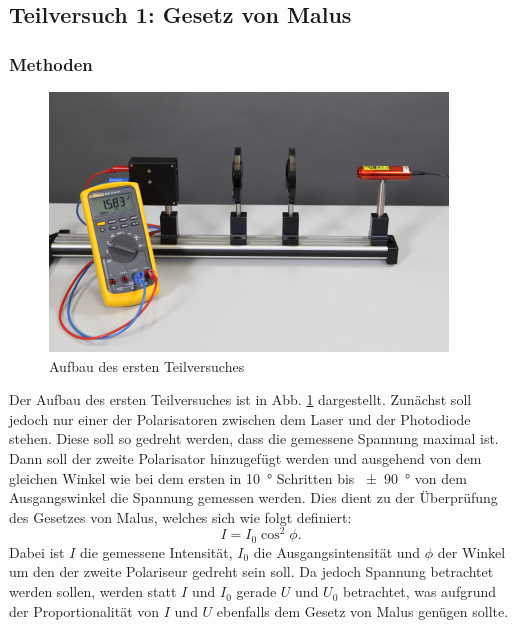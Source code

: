 \subsection{Teilversuch 1: Gesetz von Malus}
	
		\subsubsection*{Methoden}
			
			\begin{figure}[ht]
				\centering
				\includegraphics[width=\textwidth]{bilder/Polarisation.png}
				\caption{Aufbau des ersten Teilversuches\cite{WWU}}
				\label{fig:Polarisation}	
			\end{figure}
			Der Aufbau des ersten Teilversuches ist in Abb. \ref{fig:Polarisation} dargestellt.
			Zunächst soll jedoch nur einer der Polarisatoren zwischen dem Laser und der Photodiode stehen.
			Diese soll so gedreht werden, dass die gemessene Spannung maximal ist.
			Dann soll der zweite Polarisator hinzugefügt werden und ausgehend von dem gleichen Winkel wie bei dem ersten in \SI{10}{\degree} Schritten bis \SI{+-90}{\degree} von dem Ausgangswinkel die Spannung gemessen werden.
			Dies dient zu der Überprüfung des Gesetzes von Malus, welches sich wie folgt definiert:
			\begin{equation}
				I = I_0 \cos^2{\phi}.
			\end{equation}
			Dabei ist $I$ die gemessene Intensität, $I_0$ die Ausgangsintensität und $\phi$ der Winkel um den der zweite Polariseur gedreht sein soll.
			Da jedoch Spannung betrachtet werden sollen, werden statt $I$ und $I_0$ gerade $U$ und $U_0$ betrachtet, was aufgrund der Proportionalität von $I$ und $U$ ebenfalls dem Gesetz von Malus genügen sollte.
			
